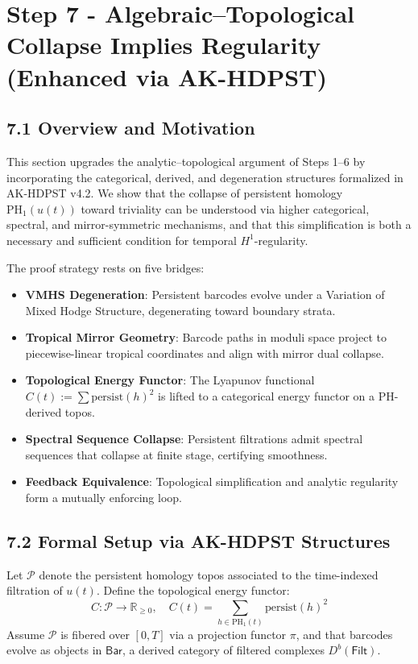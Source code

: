 \documentclass[11pt]{article}
\theoremstyle{definition}
\begin{document}
\section{Step 7 - Algebraic--Topological Collapse Implies Regularity (Enhanced via AK-HDPST)}

\subsection*{7.1 Overview and Motivation}

This section upgrades the analytic--topological argument of Steps 1--6 by incorporating the categorical, derived, and degeneration structures formalized in AK-HDPST v4.2. We show that the collapse of persistent homology $\mathrm{PH}_1(u(t))$ toward triviality can be understood via higher categorical, spectral, and mirror-symmetric mechanisms, and that this simplification is both a necessary and sufficient condition for temporal $H^1$-regularity.

The proof strategy rests on five bridges:
\begin{itemize}
    \item \textbf{VMHS Degeneration}: Persistent barcodes evolve under a Variation of Mixed Hodge Structure, degenerating toward boundary strata.
    \item \textbf{Tropical Mirror Geometry}: Barcode paths in moduli space project to piecewise-linear tropical coordinates and align with mirror dual collapse.
    \item \textbf{Topological Energy Functor}: The Lyapunov functional $C(t) := \sum \text{persist}(h)^2$ is lifted to a categorical energy functor on a PH-derived topos.
    \item \textbf{Spectral Sequence Collapse}: Persistent filtrations admit spectral sequences that collapse at finite stage, certifying smoothness.
    \item \textbf{Feedback Equivalence}: Topological simplification and analytic regularity form a mutually enforcing loop.
\end{itemize}

\subsection*{7.2 Formal Setup via AK-HDPST Structures}

Let $\mathcal{P}$ denote the persistent homology topos associated to the time-indexed filtration of $u(t)$. Define the topological energy functor:
\[
C: \mathcal{P} \to \mathbb{R}_{\geq 0}, \quad C(t) = \sum_{h \in \mathrm{PH}_1(t)} \text{persist}(h)^2
\]
Assume $\mathcal{P}$ is fibered over $[0,T]$ via a projection functor $\pi$, and that barcodes evolve as objects in $\mathsf{Bar}$, a derived category of filtered complexes $D^b(\mathsf{Filt})$.
\end{document}
